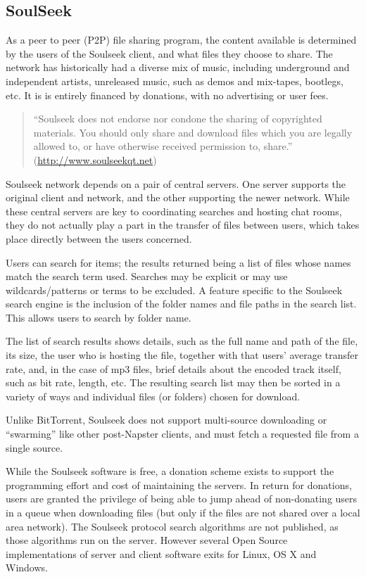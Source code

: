 \subsection{SoulSeek}

As a peer to peer (P2P) file sharing program, the content available is
determined by the users of the Soulseek client, and what files they
choose to share. The network has historically had a diverse mix of
music, including underground and independent artists, unreleased music,
such as demos and mix-tapes, bootlegs, etc. It is is entirely financed
by donations, with no advertising or user fees.

\begin{quote}
``Soulseek does not endorse nor condone the sharing of copyrighted
materials. You should only share and download files which you are
legally allowed to, or have otherwise received permission to, share.''
(\href{http://www.soulseekqt.net}{http://www.soulseekqt.net})

\end{quote}
Soulseek network depends on a pair of central servers. One server
supports the original client and network, and the other supporting the
newer network. While these central servers are key to coordinating
searches and hosting chat rooms, they do not actually play a part in the
transfer of files between users, which takes place directly between the
users concerned.

Users can search for items; the results returned being a list of files
whose names match the search term used. Searches may be explicit or may
use wildcards/patterns or terms to be excluded. A feature specific to
the Soulseek search engine is the inclusion of the folder names and file
paths in the search list. This allows users to search by folder name.

The list of search results shows details, such as the full name and path
of the file, its size, the user who is hosting the file, together with
that users' average transfer rate, and, in the case of mp3 files, brief
details about the encoded track itself, such as bit rate, length, etc.
The resulting search list may then be sorted in a variety of ways and
individual files (or folders) chosen for download.

Unlike BitTorrent, Soulseek does not support multi-source downloading or
``swarming'' like other post-Napster clients, and must fetch a requested
file from a single source.

While the Soulseek software is free, a donation scheme exists to support
the programming effort and cost of maintaining the servers. In return
for donations, users are granted the privilege of being able to jump
ahead of non-donating users in a queue when downloading files (but only
if the files are not shared over a local area network). The Soulseek
protocol search algorithms are not published, as those algorithms run on
the server. However several Open Source implementations of server and
client software exits for Linux, OS X and Windows.

